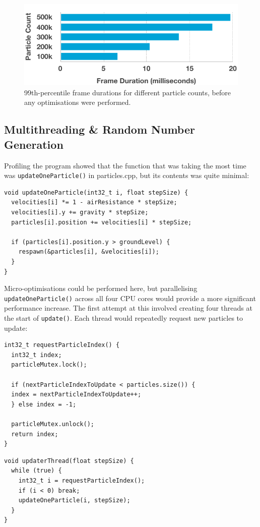 \documentclass[11pt, a4paper, twocolumn]{article}
\begin{document}
\begin{figure}[h]
\includegraphics[width=\linewidth]{initialtimes}
\caption{99th-percentile frame durations for different particle counts, before any optimisations were performed.}
\label{fig:initialtimes}
\end{figure}

\subsection{Multithreading \& Random Number Generation} \label{sec:multithread}

Profiling the program showed that the function that was taking the most time was \verb|updateOneParticle()| in particles.cpp, but its contents was quite minimal:

\begin{verbatim}
void updateOneParticle(int32_t i, float stepSize) {
  velocities[i] *= 1 - airResistance * stepSize;
  velocities[i].y += gravity * stepSize;
  particles[i].position += velocities[i] * stepSize;

  if (particles[i].position.y > groundLevel) {
    respawn(&particles[i], &velocities[i]);
  }
}
\end{verbatim}

Micro-optimisations could be performed here, but parallelising \verb|updateOneParticle()| across all four CPU cores would provide a more significant performance increase. The first attempt at this involved creating four threads at the start of \verb|update()|. Each thread would repeatedly request new particles to update:

\begin{verbatim}
int32_t requestParticleIndex() {
  int32_t index;
  particleMutex.lock();
  
  if (nextParticleIndexToUpdate < particles.size()) {
  index = nextParticleIndexToUpdate++;
  } else index = -1;
  
  particleMutex.unlock();
  return index;
}
\end{verbatim}
\begin{verbatim}
void updaterThread(float stepSize) {
  while (true) {
    int32_t i = requestParticleIndex();
    if (i < 0) break;
    updateOneParticle(i, stepSize);
  }
}
\end{verbatim}
\end{document}
